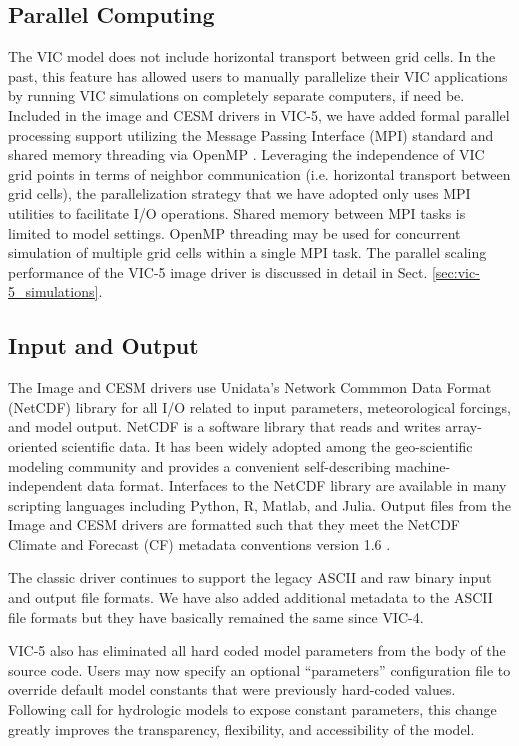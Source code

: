\documentclass[gmd, manuscript]{copernicus}
\begin{document}
  \subsection{Parallel Computing}
    \label{sec:parallel}
    The VIC model does not include horizontal transport between grid cells. In the past, this feature has allowed users to manually parallelize their VIC applications by running VIC simulations on completely separate computers, if need be. Included in the image and CESM drivers in VIC-5, we have added formal parallel processing support utilizing the Message Passing Interface (MPI) standard \citep{Gropp_1996} and shared memory threading via OpenMP \citep{Dagum_1998}. Leveraging the independence of VIC grid points in terms of neighbor communication (i.e. horizontal transport between grid cells), the parallelization strategy that we have adopted only uses MPI utilities to facilitate I/O operations. Shared memory between MPI tasks is limited to model settings. OpenMP threading may be used for concurrent simulation of multiple grid cells within a single MPI task. The parallel scaling performance of the VIC-5 image driver is discussed in detail in Sect. \ref{sec:vic-5_simulations}.

  \subsection{Input and Output}
    \label{sec:io}
    The Image and CESM drivers use Unidata's Network Commmon Data Format (NetCDF) library for all I/O related to input parameters, meteorological forcings, and model output. NetCDF is a software library that reads and writes array-oriented scientific data. It has been widely adopted among the geo-scientific modeling community and provides a convenient self-describing machine-independent data format. Interfaces to the NetCDF library are available in many scripting languages including Python, R, Matlab, and Julia. Output files from the Image and CESM drivers are formatted such that they meet the NetCDF Climate and Forecast (CF) metadata conventions version 1.6 \citep{Eaton_2003}.

    The classic driver continues to support the legacy ASCII and raw binary input and output file formats. We have also added additional metadata to the ASCII file formats but they have basically remained the same since VIC-4.

    VIC-5 also has eliminated all hard coded model parameters from the body of the source code. Users may now specify an optional ``parameters'' configuration file to override default model constants that were previously hard-coded values. Following \citet{Mendoza_2015} call for hydrologic models to expose constant parameters, this change greatly improves the transparency, flexibility, and accessibility of the model.
\end{document}
